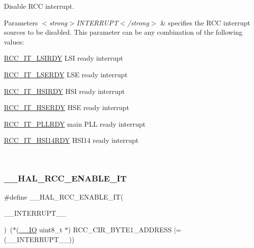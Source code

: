 Disable R\+CC interrupt. 


\begin{DoxyParams}{Parameters}
{\em $<$strong$>$\+I\+N\+T\+E\+R\+R\+U\+P\+T$<$/strong$>$} & specifies the R\+CC interrupt sources to be disabled. This parameter can be any combination of the following values\+: \begin{DoxyItemize}
\item \hyperlink{group___r_c_c___interrupt_ga2b4ef277c1b71f96e0bef4b9a72fca94}{R\+C\+C\+\_\+\+I\+T\+\_\+\+L\+S\+I\+R\+DY} L\+SI ready interrupt \item \hyperlink{group___r_c_c___interrupt_gad6b6e78a426850f595ef180d292a673d}{R\+C\+C\+\_\+\+I\+T\+\_\+\+L\+S\+E\+R\+DY} L\+SE ready interrupt \item \hyperlink{group___r_c_c___interrupt_ga69637e51b71f73f519c8c0a0613d042f}{R\+C\+C\+\_\+\+I\+T\+\_\+\+H\+S\+I\+R\+DY} H\+SI ready interrupt \item \hyperlink{group___r_c_c___interrupt_gad13eaede352bca59611e6cae68665866}{R\+C\+C\+\_\+\+I\+T\+\_\+\+H\+S\+E\+R\+DY} H\+SE ready interrupt \item \hyperlink{group___r_c_c___interrupt_ga68d48e7811fb58f2649dce6cf0d823d9}{R\+C\+C\+\_\+\+I\+T\+\_\+\+P\+L\+L\+R\+DY} main P\+LL ready interrupt \item \hyperlink{group___r_c_c___interrupt_ga3b85dd0ddf5c816fad2bb2c149129c01}{R\+C\+C\+\_\+\+I\+T\+\_\+\+H\+S\+I14\+R\+DY} H\+S\+I14 ready interrupt \end{DoxyItemize}
\\
\hline
\end{DoxyParams}
\mbox{\label{group___r_c_c___flags___interrupts___management_ga180fb20a37b31a6e4f7e59213a6c0405}} 
\subsubsection{\texorpdfstring{\+\_\+\+\_\+\+H\+A\+L\+\_\+\+R\+C\+C\+\_\+\+E\+N\+A\+B\+L\+E\+\_\+\+IT}{\_\_HAL\_RCC\_ENABLE\_IT}}
{\footnotesize\ttfamily \#define \+\_\+\+\_\+\+H\+A\+L\+\_\+\+R\+C\+C\+\_\+\+E\+N\+A\+B\+L\+E\+\_\+\+IT(\begin{DoxyParamCaption}\item[{}]{\+\_\+\+\_\+\+I\+N\+T\+E\+R\+R\+U\+P\+T\+\_\+\+\_\+ }\end{DoxyParamCaption})~($\ast$(\hyperlink{core__sc300_8h_aec43007d9998a0a0e01faede4133d6be}{\+\_\+\+\_\+\+IO} uint8\+\_\+t $\ast$) R\+C\+C\+\_\+\+C\+I\+R\+\_\+\+B\+Y\+T\+E1\+\_\+\+A\+D\+D\+R\+E\+SS $\vert$= (\+\_\+\+\_\+\+I\+N\+T\+E\+R\+R\+U\+P\+T\+\_\+\+\_\+))}



